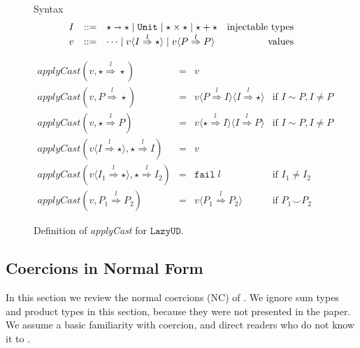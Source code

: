 \documentclass[acmsmall,review,anonymous]{acmart}\settopmatter{printfolios=true,printccs=false,printacmref=false}
\newcommand{\stxrule}[3]{#1 & ::= & #3 & \text{#2}\\}
\newcommand{\lazyUD}{$\mathtt{Lazy UD}$}
\newcommand{\POOunit}[0]{\mathtt{Unit}}
\newcommand{\POOfun}[2]{#1 \shortrightarrow #2}
\newcommand{\cOOcast}[3]{#1 \overset{#2}{\Rightarrow} #3}
\newcommand{\vOOcast}[2]{#1\langle#2\rangle}
\newcommand{\rOOfail}[1]{\mathtt{fail}\;#1}
\begin{document}
\begin{figure}

  Syntax
  \[
  \begin{array}{rclr}
     \stxrule{I}{injectable types}{
		\POOfun{\star}{\star} \mid \POOunit \mid \star \times \star \mid \star + \star}
    \stxrule{v}{values}{
      \cdots \mid 
      \vOOcast{v}{ \cOOcast{I}{l}{\star} } \mid
      \vOOcast{v}{ \cOOcast{P}{l}{P} }
    }
  \end{array}
  \]
  
  \[
  \begin{array}{rclr}
    \mathit{applyCast}(v, \cOOcast{\star}{l}{\star} ) &=& v \\
    \mathit{applyCast}(v, \cOOcast{P}{l}{\star}) &=&
        v \langle \cOOcast{P}{l}{I} \rangle
          \langle \cOOcast{I}{l}{\star} \rangle
        & \text{if } I \sim P, I \neq P \\  
    \mathit{applyCast}(v, \cOOcast{\star}{l}{P}) &=&          
        v \langle \cOOcast{\star}{l}{I} \rangle
          \langle \cOOcast{I}{l}{P} \rangle
        & \text{if } I \sim P, I \neq P \\  
  \mathit{applyCast}(v \langle \cOOcast{I}{l}{\star} \rangle , \cOOcast{\star}{l}{I}) &=& v \\
  \mathit{applyCast}(v \langle \cOOcast{I_1}{l}{\star} \rangle , \cOOcast{\star}{l}{I_2}) &=& \rOOfail{l} & \text{if } I_1 \neq I_2 \\
  \mathit{applyCast}(v, \cOOcast{P_1}{l}{P_2}) &=&
     v \langle \cOOcast{P_1}{l}{P_2} \rangle & \text{if } P_1 \smile P_2
  \end{array}
  \]


  \caption{Definition of \textit{applyCast} for \lazyUD{}.}
  \label{fig:apply-Cast-UD}
\end{figure}


\clearpage
\pagebreak

\subsection{Coercions in Normal Form} \label{sec:coercion-calculus}

In this section we review the normal coercions (NC) of 
\citet{siek2012interpretations}.
We ignore sum types and product types in this 
section, because they were not presented in the paper. We assume a basic 
familiarity with coercion, and direct readers who do not know it to 
\citet{siek2012interpretations}.
\end{document}
